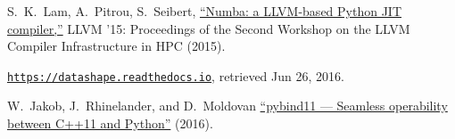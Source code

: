 \documentclass{webofc}
\begin{document}
\begin{thebibliography}{}
S.\ K.\ Lam, A.\ Pitrou, S.\ Seibert, \href{https://doi.org/10.1145/2833157.2833162}{``Numba: a LLVM-based Python JIT compiler,''} LLVM '15: Proceedings of the Second Workshop on the LLVM Compiler Infrastructure in HPC (2015).

\href{https://web.archive.org/web/20160626181703/https://datashape.readthedocs.io/en/latest/}{\tt https://datashape.readthedocs.io}, retrieved Jun 26, 2016.

W.\ Jakob, J.\ Rhinelander, and D.\ Moldovan \href{https://github.com/pybind/pybind11}{``pybind11 --- Seamless operability between C++11 and Python''} (2016).

\end{thebibliography}
\end{document}
